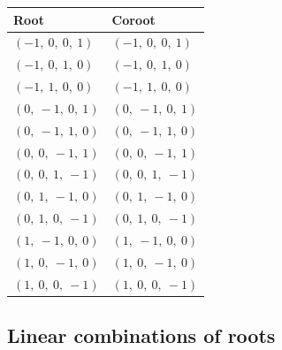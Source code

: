 \documentclass[11pt]{article}
\theoremstyle{definition}
\newif\ifsummablepairs
\begin{document}
\bigskip

\noindent \begin{tabular}{|l|l|}
    \hline
    \textbf{Root} & \textbf{Coroot} \\
    \hline
    $\left( -1, \  0, \  0, \  1\right)$ & $\left( -1, \  0, \  0, \  1\right)$ \\
    \hline
    $\left( -1, \  0, \  1, \  0\right)$ & $\left( -1, \  0, \  1, \  0\right)$ \\
    \hline
    $\left( -1, \  1, \  0, \  0\right)$ & $\left( -1, \  1, \  0, \  0\right)$ \\
    \hline
    $\left( 0, \  -1, \  0, \  1\right)$ & $\left( 0, \  -1, \  0, \  1\right)$ \\
    \hline
    $\left( 0, \  -1, \  1, \  0\right)$ & $\left( 0, \  -1, \  1, \  0\right)$ \\
    \hline
    $\left( 0, \  0, \  -1, \  1\right)$ & $\left( 0, \  0, \  -1, \  1\right)$ \\
    \hline
    $\left( 0, \  0, \  1, \  -1\right)$ & $\left( 0, \  0, \  1, \  -1\right)$ \\
    \hline
    $\left( 0, \  1, \  -1, \  0\right)$ & $\left( 0, \  1, \  -1, \  0\right)$ \\
    \hline
    $\left( 0, \  1, \  0, \  -1\right)$ & $\left( 0, \  1, \  0, \  -1\right)$ \\
    \hline
    $\left( 1, \  -1, \  0, \  0\right)$ & $\left( 1, \  -1, \  0, \  0\right)$ \\
    \hline
    $\left( 1, \  0, \  -1, \  0\right)$ & $\left( 1, \  0, \  -1, \  0\right)$ \\
    \hline
    $\left( 1, \  0, \  0, \  -1\right)$ & $\left( 1, \  0, \  0, \  -1\right)$ \\
    \hline
\end{tabular}


\ifsummablepairs
\subsection{Linear combinations of roots}
\end{document}
